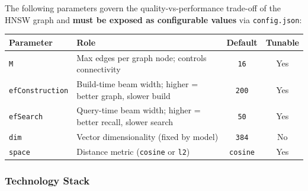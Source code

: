 \documentclass[12pt, a4paper]{article}
\begin{document}
The following parameters govern the quality-vs-performance trade-off of the
HNSW graph and \textbf{must be exposed as configurable values} via
\texttt{config.json}:

\begin{tcolorbox}[standardbox, colback=white, colframe=ctPurple, leftrule=4pt]
\begin{center}
\small
\begin{tabular}{@{} l p{6.2cm} c c @{}}
    \toprule
    \textbf{Parameter} & \textbf{Role} & \textbf{Default} & \textbf{Tunable} \\
    \midrule
    \texttt{M}
        & Max edges per graph node; controls connectivity
        & \texttt{16} & Yes \\
    \addlinespace
    \texttt{efConstruction}
        & Build-time beam width; higher = better graph, slower build
        & \texttt{200} & Yes \\
    \addlinespace
    \texttt{efSearch}
        & Query-time beam width; higher = better recall, slower search
        & \texttt{50} & Yes \\
    \addlinespace
    \texttt{dim}
        & Vector dimensionality (fixed by model)
        & \texttt{384} & No \\
    \addlinespace
    \texttt{space}
        & Distance metric (\texttt{cosine} or \texttt{l2})
        & \texttt{cosine} & Yes \\
    \bottomrule
\end{tabular}
\end{center}
\end{tcolorbox}

\vspace{0.5cm}
\subsubsection*{\textsf{\textcolor{ctPurple}{Technology Stack}}}
\vspace{0.2cm}
\end{document}
